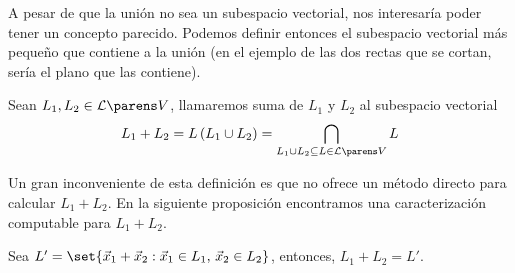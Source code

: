 \documentclass[../algebra_lineal.tex]{subfiles}
\begin{document}
A pesar de que la unión no sea un subespacio vectorial, nos interesaría poder tener un concepto parecido. Podemos definir entonces el subespacio vectorial más pequeño que contiene a la unión (en el ejemplo de las dos rectas que se cortan, sería el plano que las contiene). 

\begin{definition}[Suma]
    Sean $L_1, L_2 \in \subespaciosde{V}$, llamaremos suma de $L_1$ y $L_2$ al subespacio vectorial 
    \[
        L_1 + L_2 = \lspan{L_1 \cup L_2} = \bigcap_{L_1 \cup L_2 \subseteq L \in \subespaciosde{V}}L
    \]
\end{definition}

Un gran inconveniente de esta definición es que no ofrece un método directo para calcular $L_1 + L_2$. En la siguiente proposición encontramos una caracterización computable para $L_1 + L_2$.

\begin{proposition}
    Sea $L' = \set{\vx_1 + \vx_2 : \vx_1 \in L_1, \, \vx_2 \in L_2}$, entonces, $L_1 + L_2 = L'$.
\end{proposition}
\end{document}
